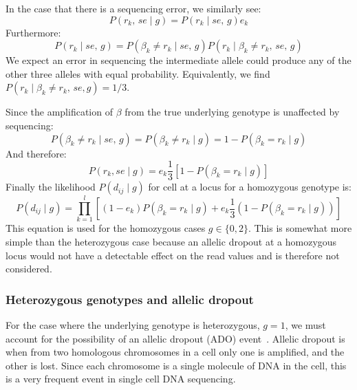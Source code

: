 \documentclass[../../main.tex]{subfiles}
\begin{document}
In the case that there is a sequencing error, we similarly see:
\begin{equation*}
    P(r_k,\, se \mid g) = P(r_k\mid se,\, g)e_k
\end{equation*}
Furthermore:
\begin{equation*}
    P(r_k\mid se,\, g) = P(\beta_k\neq r_k \mid se,\,g) P(r_k\mid \beta_k\neq r_k,\,se,\,g)
\end{equation*}
We expect an error in sequencing the intermediate allele could produce any of the other three alleles with equal probability.
Equivalently, we find $P(r_k\mid \beta_k \neq r_k,\,se,g)=1/3$.

Since the amplification of $\beta$ from the true underlying genotype is unaffected by sequencing:
\begin{equation*}
    P(\beta_k\neq r_k \mid se,\,g)=P(\beta_k\neq r_k\mid g)=1-P(\beta_k=r_k\mid g)
\end{equation*}
And therefore:
\begin{equation*}
    P(r_k, se \mid g) = e_k \frac{1}{3}\left[1-P(\beta_k=r_k\mid g)\right]
\end{equation*}
Finally the likelihood $P(d_{ij}\mid g)$ for cell at a locus for a homozygous genotype is:
\begin{equation}
     P(d_{ij}\mid g) = \prod_{k=1}^l \left[ (1-e_k)P(\beta_k=r_k\mid g) + e_k \frac{1}{3} (1-P(\beta_k=r_k\mid g)) \right]
\end{equation}
This equation is used for the homozygous cases $g\in\{0,2\}$.
This is somewhat more simple than the heterozygous case because an allelic dropout at a homozygous locus would not have a detectable effect on the read values and is therefore not considered.

\subsubsection*{Heterozygous genotypes and allelic dropout}
For the case where the underlying genotype is heterozygous, $g=1$, we must account for the possibility of an allelic dropout (ADO) event~\cite{monovar,sciphi}.
Allelic dropout is when from two homologous chromosomes in a cell only one is amplified, and the other is lost.
Since each chromosome is a single molecule of DNA in the cell, this is a very frequent event in single cell DNA sequencing.
\end{document}
